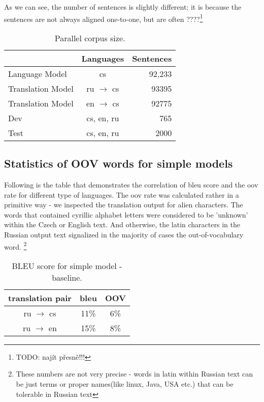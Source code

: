 \documentclass[11pt,letterpaper]{article}
\begin{document}
As we can see, the number of sentences is slightly different; it is because the sentences are not always aligned one-to-one, but are often ????\footnote{TODO: najít přesně!!!}
\begin{table}

\begin{center}
\begin{tabular}{lcr}
  &  Languages & Sentences \\
\hline
Language Model & cs & 92,233 \\
Translation Model & ru $\rightarrow$ cs &  93395\\
Translation Model & en $\rightarrow$ cs &  92775\\ \hline %
Dev     & cs, en, ru          &    765 \\
Test     & cs, en, ru          &  2000 \\
\hline
\end{tabular}
\end{center}
\caption{Parallel corpus size.}
\label{tab:corpus}
\end{table}



\subsection{Statistics of OOV words for simple models} 

Following is the table that demonstrates the correlation of bleu score and 
the oov rate for different type of languages. 
The oov rate was calculated 
rather in a primitive way - we inspected the translation output for alien characters. The words that contained
cyrillic alphabet letters were considered to be 'unknown' within the Czech or English text.
And otherwise, the latin characters in the Russian output text signalized in the majority of cases 
the out-of-vocabulary word. \footnote{These numbers are not very precise - words in latin within Russian text
can be just terms or proper names(like linux, Java, USA etc.) that can be tolerable in Russian text }

 
\begin{table*}
\begin{center}
\begin{tabular}{c c c}
\hline
translation pair& bleu & OOV \\
\hline
ru $\rightarrow$ cs & 11\% & 6\% \\%
ru $\rightarrow$  en & 15\% & 8\% \\ %
\hline
\end{tabular}
\end{center}
\caption{BLEU score for simple model - baseline.}
\label{tab:umc_yan}
\end{table*}
\end{document}

